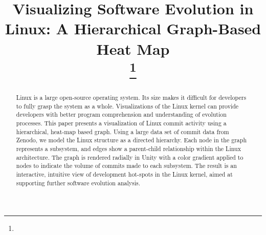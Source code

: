\documentclass[conference]{IEEEtran}
\begin{document}
\title{Visualizing Software Evolution in Linux: A Hierarchical Graph-Based Heat Map\\

\thanks{}
}

\author{
\and
{}
}



\maketitle

\begin{abstract}
Linux is a large open-source operating system. Its size makes it difficult for developers to fully grasp the system as a whole. Visualizations of the Linux kernel can provide developers with better program comprehension and understanding of evolution processes. This paper presents a visualization of Linux commit activity using a hierarchical, heat-map based graph. Using a large data set of commit data from Zenodo, we model the Linux structure as a directed hierarchy. Each node in the graph represents a subsystem, and edges show a parent-child relationship within the Linux architecture. The graph is rendered radially in Unity with a color gradient applied to nodes to indicate the volume of commits made to each subsystem. The result is an interactive, intuitive view of development hot-spots in the Linux kernel, aimed at supporting further software evolution analysis. 
\end{abstract}
\end{document}
